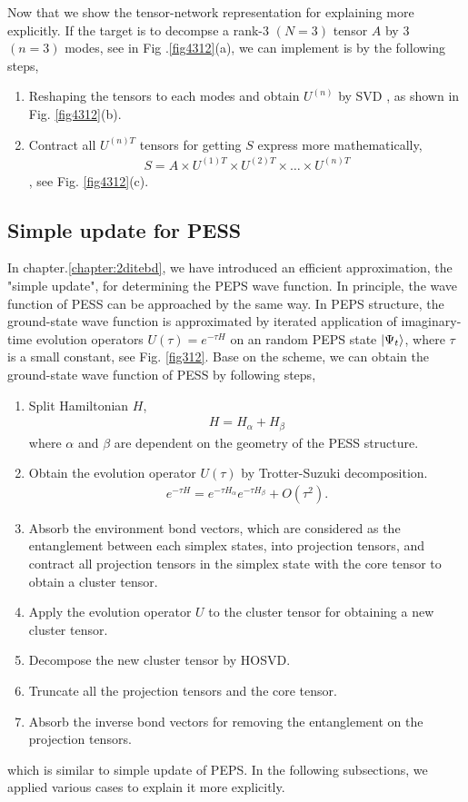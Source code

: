 Now that we show the tensor-network representation for explaining more explicitly. If the target is to decompse a rank-3 $(N=3)$ tensor $A$ by 3 $(n=3)$ modes, see in Fig .\ref{fig4312}(a), we can implement is by the following steps, 
\begin{enumerate}
	\item	Reshaping the tensors to each modes and obtain $U^{(n)}$ by SVD , as shown in Fig. \ref{fig4312}(b).
	\item	Contract all $U^{(n)T}$ tensors for getting $S$ express more mathematically, 
		\begin{align}
			S = A \times U^{(1)T} \times U^{(2)T} \times \dots \times U^{(n)T}
		\end{align} 
		, see Fig. \ref{fig4312}(c).
\end{enumerate}
\subsection{Simple update for PESS}
In chapter.\ref{chapter:2ditebd}, we have introduced an efficient approximation, the "simple update", for determining the PEPS wave function. In principle, the wave function of PESS can be approached by the same way.
In PEPS structure, the ground-state wave function is approximated by iterated application of imaginary-time evolution operators $U(\tau) = e^{-\tau H}$ on an random PEPS state $\Ket{\Psi_t}$, where $\tau$ is a small constant, see Fig. \ref{fig312}. Base on the scheme, we can obtain the ground-state wave function of PESS by following steps,
\begin{enumerate}
	\item Split Hamiltonian $H$,  
		\begin{align}
			\label{splitH}
			H = H_{\alpha} + H_{\beta}
		\end{align}
		where $\alpha$ and $\beta$ are dependent on the geometry of the PESS structure.
	\item Obtain the evolution operator $U(\tau)$ by Trotter-Suzuki decomposition.
		\begin{align}
			e^{-\tau H} = e^{-\tau H_{\alpha}} e^{-\tau H_{\beta}} + O(\tau^{2}).
		\end{align}
	\item Absorb the environment bond vectors, which are considered as the entanglement between each simplex states, into projection tensors, and contract all projection tensors in the simplex state with the core tensor to obtain a cluster tensor.
	\item Apply the evolution operator $U$ to the cluster tensor for obtaining a new cluster tensor.
	\item Decompose the new cluster tensor by HOSVD.
	\item Truncate all the projection tensors and the core tensor.
	\item Absorb the inverse bond vectors for removing the entanglement on the projection tensors.
\end{enumerate}
which is similar to simple update of PEPS. In the following subsections, we applied various cases to explain it more explicitly.
